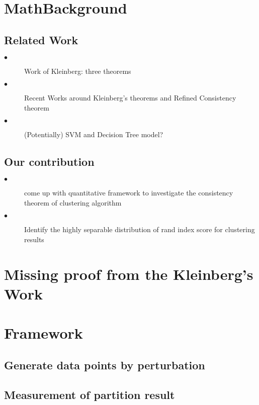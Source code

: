 \documentclass{uonmathreport}
\begin{document}
\section{MathBackground} \label{sec:background}


\subsection{Related Work} \label{subsec:Related Work}
\begin{description}
  \item[$\bullet$] Work of Kleinberg: three theorems
  \item[$\bullet$] Recent Works around Kleinberg's theorems and Refined Consistency theorem
  \item[$\bullet$] (Potentially) SVM and Decision Tree model?
\end{description}
\subsection{Our contribution} \label{subsec:Our contribution}
\begin{description}
  \item[$\bullet$] come up with quantitative framework to investigate the consistency theorem of clustering algorithm
  
  \item[$\bullet$] Identify the highly separable distribution of rand index score for clustering results
\end{description}

\section{Missing proof from the Kleinberg's Work} \label{sec:Missing proof}



\section{Framework} \label{sec:framework}

\subsection{Generate data points by perturbation} \label{subsec:blue}

\subsection{Measurement of partition result} \label{subsubsec:red}
\end{document}
